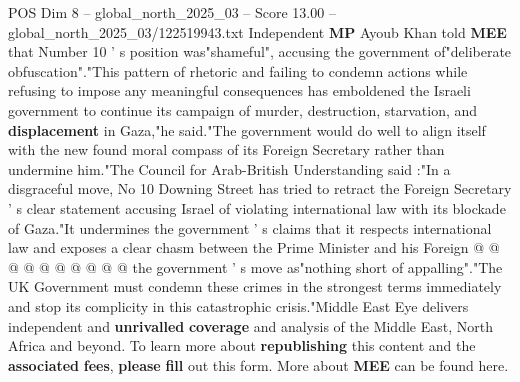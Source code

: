 \begin{textsample}{POS Dim 8 – global\_north\_2025\_03 – Score 13.00 – global\_north\_2025\_03/122519943.txt}
Independent \textbf{MP} Ayoub Khan told \textbf{MEE} that Number 10 ' s position was"shameful", accusing the government of"deliberate obfuscation"."This pattern of rhetoric and failing to condemn actions while refusing to impose any meaningful consequences has emboldened the Israeli government to continue its campaign of murder, destruction, starvation, and \textbf{displacement} in Gaza,"he said."The government would do well to align itself with the new found moral compass of its Foreign Secretary rather than undermine him."The Council for Arab-British Understanding said :"In a disgraceful move, No 10 Downing Street has tried to retract the Foreign Secretary ' s clear statement accusing Israel of violating international law with its blockade of Gaza."It undermines the government ' s claims that it respects international law and exposes a clear chasm between the Prime Minister and his Foreign @ @ @ @ @ @ @ @ @ @ the government ' s move as"nothing short of appalling"."The UK Government must condemn these crimes in the strongest terms immediately and stop its complicity in this catastrophic crisis."Middle East Eye delivers independent and \textbf{unrivalled} \textbf{coverage} and analysis of the Middle East, North Africa and beyond.
To learn more about \textbf{republishing} this content and the \textbf{associated} \textbf{fees}, \textbf{please} \textbf{fill} out this form.
More about \textbf{MEE} can be found here.

\end{textsample}
